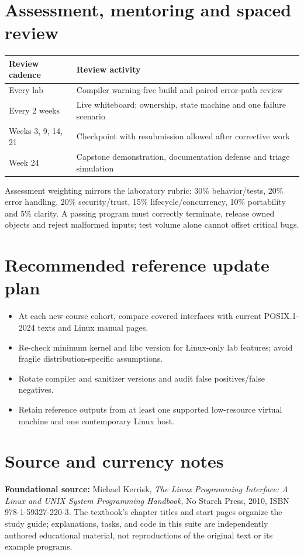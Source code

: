 \documentclass[11pt,letterpaper,oneside]{report}
\begin{document}
\chapter{Assessment, mentoring and spaced review}
\begin{longtable}{p{.23\linewidth}p{.60\linewidth}}\toprule
Review cadence & Review activity\\\midrule\endhead
Every lab & Compiler warning-free build and paired error-path review\\
Every 2 weeks & Live whiteboard: ownership, state machine and one failure scenario\\
Weeks 3, 9, 14, 21 & Checkpoint with resubmission allowed after corrective work\\
Week 24 & Capstone demonstration, documentation defense and triage simulation\\
\bottomrule\end{longtable}Assessment weighting mirrors the laboratory rubric: 30\% behavior/tests, 20\% error handling, 20\% security/trust, 15\% lifecycle/concurrency, 10\% portability and 5\% clarity. A passing program must correctly terminate, release owned objects and reject malformed inputs; test volume alone cannot offset critical bugs.

\chapter{Recommended reference update plan}
\begin{itemize}
\item At each new course cohort, compare covered interfaces with current POSIX.1-2024 texts and Linux manual pages.
\item Re-check minimum kernel and libc version for Linux-only lab features; avoid fragile distribution-specific assumptions.
\item Rotate compiler and sanitizer versions and audit false positives/false negatives.
\item Retain reference outputs from at least one supported low-resource virtual machine and one contemporary Linux host.
\end{itemize}

\chapter*{Source and currency notes}
\textbf{Foundational source:} Michael Kerrisk, \emph{The Linux Programming Interface: A Linux and UNIX System Programming Handbook}, No Starch Press, 2010, ISBN 978-1-59327-220-3. The textbook's chapter titles and start pages organize the study guide; explanations, tasks, and code in this suite are independently authored educational material, not reproductions of the original text or its example programs.
\end{document}
